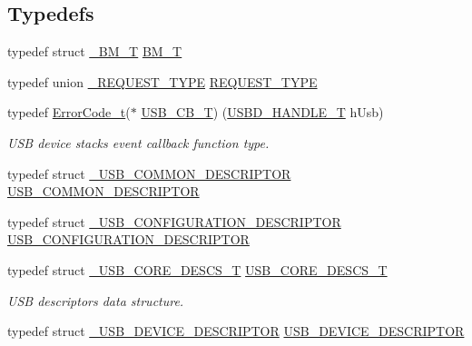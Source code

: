 \subsection*{Typedefs}
\begin{DoxyCompactItemize}
\item 
typedef struct \hyperlink{struct__BM__T}{\+\_\+\+B\+M\+\_\+T} \hyperlink{group__USBD__Core_ga0c191764322e096fa81c1228eb62e63f}{B\+M\+\_\+T}
\item 
typedef union \hyperlink{union__REQUEST__TYPE}{\+\_\+\+R\+E\+Q\+U\+E\+S\+T\+\_\+\+T\+Y\+PE} \hyperlink{group__USBD__Core_gac85164494feb72445fab7999a3723b6f}{R\+E\+Q\+U\+E\+S\+T\+\_\+\+T\+Y\+PE}
\item 
typedef \hyperlink{error_8h_a905255056c349318139d94aa4523d516}{Error\+Code\+\_\+t}($\ast$ \hyperlink{group__USBD__Core_ga0404ce046312aa5c798cc4a05c417e46}{U\+S\+B\+\_\+\+C\+B\+\_\+T}) (\hyperlink{group__USBD__Core_gafdbb2204d929cb9d75736bd2b42342ac}{U\+S\+B\+D\+\_\+\+H\+A\+N\+D\+L\+E\+\_\+T} h\+Usb)
\begin{DoxyCompactList}\small\item\em U\+SB device stack\textquotesingle{}s event callback function type. \end{DoxyCompactList}\item 
typedef struct \hyperlink{struct__USB__COMMON__DESCRIPTOR}{\+\_\+\+U\+S\+B\+\_\+\+C\+O\+M\+M\+O\+N\+\_\+\+D\+E\+S\+C\+R\+I\+P\+T\+OR} \hyperlink{group__USBD__Core_gae20aa0e1d1e5418dbef678b53b2c3ebe}{U\+S\+B\+\_\+\+C\+O\+M\+M\+O\+N\+\_\+\+D\+E\+S\+C\+R\+I\+P\+T\+OR}
\item 
typedef struct \hyperlink{struct__USB__CONFIGURATION__DESCRIPTOR}{\+\_\+\+U\+S\+B\+\_\+\+C\+O\+N\+F\+I\+G\+U\+R\+A\+T\+I\+O\+N\+\_\+\+D\+E\+S\+C\+R\+I\+P\+T\+OR} \hyperlink{group__USBD__Core_ga196f799666c475a9064909c6e72b9d72}{U\+S\+B\+\_\+\+C\+O\+N\+F\+I\+G\+U\+R\+A\+T\+I\+O\+N\+\_\+\+D\+E\+S\+C\+R\+I\+P\+T\+OR}
\item 
typedef struct \hyperlink{struct__USB__CORE__DESCS__T}{\+\_\+\+U\+S\+B\+\_\+\+C\+O\+R\+E\+\_\+\+D\+E\+S\+C\+S\+\_\+T} \hyperlink{group__USBD__Core_gabdc617d119eac0555f91bea957c41ecc}{U\+S\+B\+\_\+\+C\+O\+R\+E\+\_\+\+D\+E\+S\+C\+S\+\_\+T}
\begin{DoxyCompactList}\small\item\em U\+SB descriptors data structure. \end{DoxyCompactList}\item 
typedef struct \hyperlink{struct__USB__DEVICE__DESCRIPTOR}{\+\_\+\+U\+S\+B\+\_\+\+D\+E\+V\+I\+C\+E\+\_\+\+D\+E\+S\+C\+R\+I\+P\+T\+OR} \hyperlink{group__USBD__Core_ga7c2da119cc5c129d253d5fa766c70893}{U\+S\+B\+\_\+\+D\+E\+V\+I\+C\+E\+\_\+\+D\+E\+S\+C\+R\+I\+P\+T\+OR}

\end{DoxyCompactItemize}
